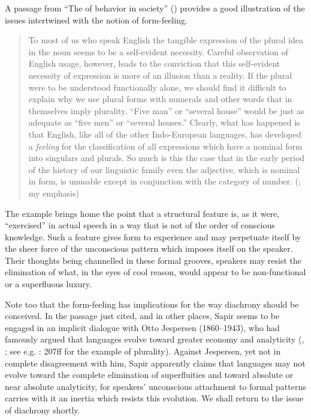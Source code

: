 \documentclass[output=paper]{langscibook}
\begin{document}
A passage from ``The  of behavior in society'' (\citeyear{Sapir1927b}) provides a good illustration of the issues intertwined with the notion of form-feeling.

\begin{quotation}
To most of us who speak English the tangible expression of the plural idea in the noun seems to be a self-evident necessity. Careful observation of English usage, however, leads to the conviction that this self-evident necessity of expression is more of an illusion than a reality. If the plural were to be understood functionally alone, we should find it difficult to explain why we use plural forms with numerals and other words that in themselves imply plurality. ``Five man'' or ``several house'' would be just as adequate as ``five men'' or ``several houses.'' Clearly, what has happened is that English, like all of the other Indo-European languages, has developed a \emph{feeling} for the classification of all expressions which have a nominal form into singulars and plurals. So much is this the case that in the early period of the history of our linguistic family even the adjective, which is nominal in form, is unusable except in conjunction with the category of number. (\citealt[550]{Sapir1927b}; my emphasis)
\end{quotation}

The example brings home the point that a structural feature is, as it were, ``exercised'' in actual speech in a way that is not of the order of conscious knowledge. Such a feature gives form to experience and may perpetuate itself by the sheer force of the unconscious pattern which imposes itself on the speaker. Their thoughts being channelled in these formal grooves, speakers may resist the elimination of what, in the eyes of cool reason, would appear to be non-functional or a superfluous luxury.

Note too that the form-feeling has implications for the way diachrony should be conceived. In the passage just cited, and in other places, Sapir seems to be engaged in an implicit dialogue with Otto Jespersen (1860--1943), who had famously argued that languages evolve toward greater economy and analyticity (\citeyear{Jespersen1894}, \citeyear{Jespersen1965}; see e.g. \citeyear{Jespersen1965}: 207ff for the example of plurality). Against Jespersen, yet not in complete disagreement with him, Sapir apparently claims that languages may not evolve toward the complete elimination of superfluities and toward absolute or near absolute analyticity, for speakers' unconscious attachment to formal patterns carries with it an inertia which resists this evolution. We shall return to the issue of diachrony shortly.
\end{document}
